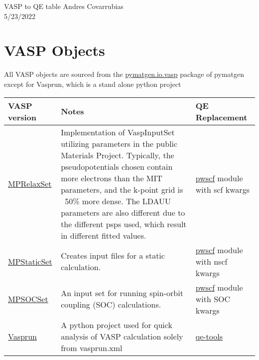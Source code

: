 \documentclass[12pt]{article}
\begin{document}
\noindent VASP to QE table \hfill Andres Covarrubias    \\
5/23/2022

\hrulefill

\section*{VASP Objects}
All VASP objects are sourced from the \href{https://pymatgen.org/pymatgen.io.vasp.html?highlight=io\%20vasp\#module-pymatgen.io.vasp}{pymatgen.io.vasp} package of pymatgen except for Vasprun, which is a stand alone python project
\begin{center}
\begin{table}[ht]
\begin{tabularx}{\linewidth}{|>{\RaggedRight}p{2.5cm}|x|x|}\hline
 VASP version & Notes & QE Replacement \\ \hline
 
 \href{https://pymatgen.org/pymatgen.io.vasp.sets.html?highlight=mprelaxset#pymatgen.io.vasp.sets.MPRelaxSet}{MPRelaxSet} & 
 Implementation of VaspInputSet utilizing parameters in the public Materials Project. Typically, the pseudopotentials chosen contain more electrons than the MIT parameters, and the k-point grid is ~50\% more dense. The LDAUU parameters are also different due to the different psps used, which result in different fitted values. & 
\href{https://pymatgen.org/pymatgen.io.pwscf.html?highlight=pwscf}{pwscf} module with scf kwargs\\ \hline
 
 \href{https://pymatgen.org/pymatgen.io.vasp.sets.html?highlight=mpstaticset#pymatgen.io.vasp.sets.MPStaticSet}{MPStaticSet} &
Creates input files for a static calculation. &
\href{https://pymatgen.org/pymatgen.io.pwscf.html?highlight=pwscf}{pwscf} module with nscf kwargs \\ \hline
 
 \href{https://pymatgen.org/pymatgen.io.vasp.sets.html?highlight=mpsocset#pymatgen.io.vasp.sets.MPSOCSet}{MPSOCSet} &
 An input set for running spin-orbit coupling (SOC) calculations. &
\href{https://pymatgen.org/pymatgen.io.pwscf.html?highlight=pwscf}{pwscf} module with SOC kwargs \\ \hline
 
 \href{https://vasprun-xml.readthedocs.io/en/latest/}{Vasprun} &
 A python project used for quick analysis of VASP calculation solely from vasprun.xml &
 \href{https://github.com/maxhutch/qe-tools/blob/master/README.md}{qe-tools} \\ \hline
\end{tabularx}
\end{table}
\end{center}
\newpage
\end{document}
